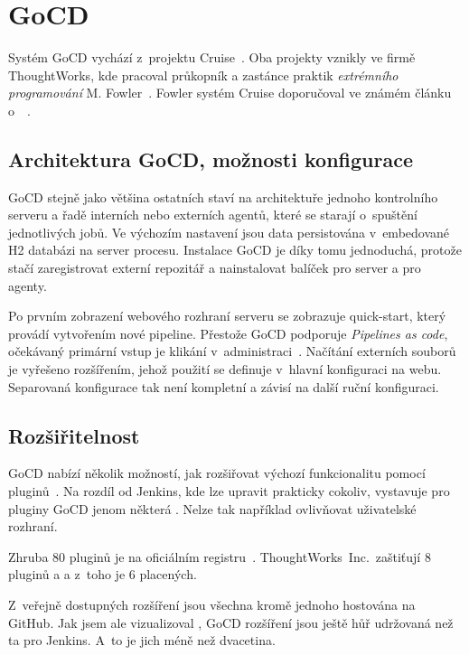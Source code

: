 \section{GoCD}
    Systém GoCD vychází z~projektu Cruise~\cite{thoughtworks-gocd}. Oba projekty vznikly ve firmě ThoughtWorks, kde pracoval průkopník a zastánce praktik \textit{extrémního programování} M. Fowler~\cite{fowler-go}. Fowler systém Cruise doporučoval ve známém článku o~\CI~\cite{fowler-ci}.

    \subsection{Architektura GoCD, možnosti konfigurace}
        GoCD stejně jako většina ostatních \CI staví na architektuře jednoho kontrolního serveru a řadě interních nebo externích agentů, které se starají o~spuštění jednotlivých jobů. Ve výchozím nastavení jsou data persistována v~embedované H2 databázi na server procesu. Instalace GoCD je díky tomu jednoduchá, protože stačí zaregistrovat externí repozitář a nainstalovat balíček pro server a pro agenty.

        Po prvním zobrazení webového rozhraní serveru se zobrazuje quick-start, který provádí vytvořením nové pipeline. Přestože GoCD podporuje \textit{Pipelines as code}, očekávaný primární vstup je klikání v~administraci~\cite{gocd-pas}. Načítání externích souborů je vyřešeno rozšířením, jehož použití se definuje v~hlavní  konfiguraci na webu. Separovaná konfigurace tak není kompletní a závisí na další ruční konfiguraci.

    \subsection{Rozšiřitelnost}
        GoCD nabízí několik možností, jak rozšiřovat výchozí funkcionalitu pomocí pluginů~\cite{gocd-extensions}. Na rozdíl od Jenkins, kde lze upravit prakticky cokoliv, vystavuje pro pluginy GoCD jenom některá . Nelze tak například ovlivňovat uživatelské rozhraní.

        Zhruba 80 pluginů je na oficiálním registru~\cite{gocd-plugins}. ThoughtWorks~Inc.~zaštiťují 8 pluginů a a z~toho je 6 placených.

        Z~veřejně dostupných rozšíření jsou všechna kromě jednoho hostována na GitHub. Jak jsem ale vizualizoval , GoCD rozšíření jsou ještě hůř udržovaná než ta pro Jenkins. A~to je jich méně než dvacetina.

